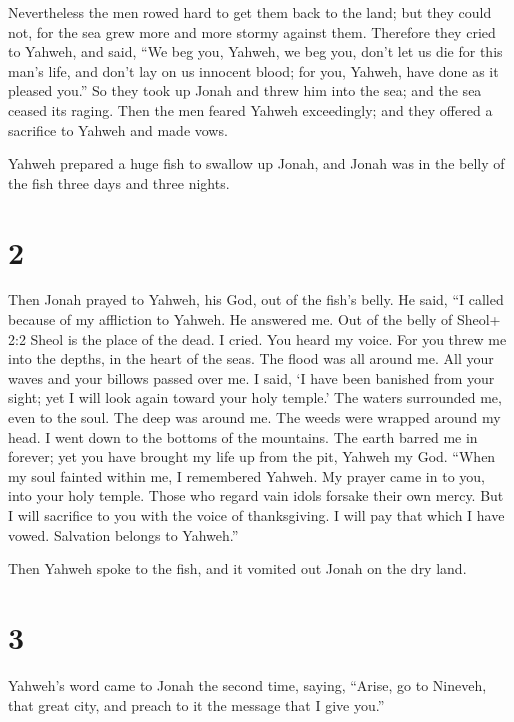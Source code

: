  Nevertheless the men rowed hard to get them back to the
land; but they could not, for the sea grew more and more stormy against
them.  Therefore they cried to Yahweh, and said, ``We beg
you, Yahweh, we beg you, don't let us die for this man's life, and don't
lay on us innocent blood; for you, Yahweh, have done as it pleased
you.''  So they took up Jonah and threw him into the sea;
and the sea ceased its raging.  Then the men feared Yahweh
exceedingly; and they offered a sacrifice to Yahweh and made vows.

 Yahweh prepared a huge fish to swallow up Jonah, and Jonah
was in the belly of the fish three days and three nights.

\hypertarget{section-1}{%
\section{2}\label{section-1}}

 Then Jonah prayed to Yahweh, his God, out of the fish's
belly.  He said, ``I called because of my affliction to
Yahweh. He answered me. Out of the belly of Sheol+ 2:2 Sheol is the
place of the dead. I cried. You heard my voice.  For you
threw me into the depths, in the heart of the seas. The flood was all
around me. All your waves and your billows passed over me. 
I said, `I have been banished from your sight; yet I will look again
toward your holy temple.'  The waters surrounded me, even to
the soul. The deep was around me. The weeds were wrapped around my head.
 I went down to the bottoms of the mountains. The earth
barred me in forever; yet you have brought my life up from the pit,
Yahweh my God.  ``When my soul fainted within me, I
remembered Yahweh. My prayer came in to you, into your holy temple.
 Those who regard vain idols forsake their own mercy.
 But I will sacrifice to you with the voice of thanksgiving.
I will pay that which I have vowed. Salvation belongs to Yahweh.''

 Then Yahweh spoke to the fish, and it vomited out Jonah on
the dry land.

\hypertarget{section-2}{%
\section{3}\label{section-2}}

 Yahweh's word came to Jonah the second time, saying,
 ``Arise, go to Nineveh, that great city, and preach to it
the message that I give you.''


